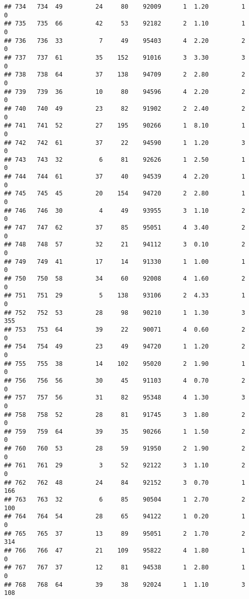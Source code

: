 \documentclass[
]{article}
\begin{document}
\begin{verbatim}
## 734   734  49         24     80    92009      1  1.20         1        0
## 735   735  66         42     53    92182      2  1.10         1        0
## 736   736  33          7     49    95403      4  2.20         2        0
## 737   737  61         35    152    91016      3  3.30         3        0
## 738   738  64         37    138    94709      2  2.80         2        0
## 739   739  36         10     80    94596      4  2.20         2        0
## 740   740  49         23     82    91902      2  2.40         2        0
## 741   741  52         27    195    90266      1  8.10         1        0
## 742   742  61         37     22    94590      1  1.20         3        0
## 743   743  32          6     81    92626      1  2.50         1        0
## 744   744  61         37     40    94539      4  2.20         1        0
## 745   745  45         20    154    94720      2  2.80         1        0
## 746   746  30          4     49    93955      3  1.10         2        0
## 747   747  62         37     85    95051      4  3.40         2        0
## 748   748  57         32     21    94112      3  0.10         2        0
## 749   749  41         17     14    91330      1  1.00         1        0
## 750   750  58         34     60    92008      4  1.60         2        0
## 751   751  29          5    138    93106      2  4.33         1        0
## 752   752  53         28     98    90210      1  1.30         3      355
## 753   753  64         39     22    90071      4  0.60         2        0
## 754   754  49         23     49    94720      1  1.20         2        0
## 755   755  38         14    102    95020      2  1.90         1        0
## 756   756  56         30     45    91103      4  0.70         2        0
## 757   757  56         31     82    95348      4  1.30         3        0
## 758   758  52         28     81    91745      3  1.80         2        0
## 759   759  64         39     35    90266      1  1.50         2        0
## 760   760  53         28     59    91950      2  1.90         2        0
## 761   761  29          3     52    92122      3  1.10         2        0
## 762   762  48         24     84    92152      3  0.70         1      166
## 763   763  32          6     85    90504      1  2.70         2      100
## 764   764  54         28     65    94122      1  0.20         1        0
## 765   765  37         13     89    95051      2  1.70         2      314
## 766   766  47         21    109    95822      4  1.80         1        0
## 767   767  37         12     81    94538      1  2.80         1        0
## 768   768  64         39     38    92024      1  1.10         3      108

\end{verbatim}
\end{document}
